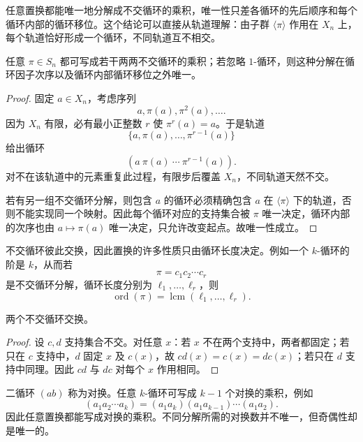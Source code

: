 任意置换都能唯一地分解成不交循环的乘积，唯一性只差各循环的先后顺序和每个循环内部的循环移位。这个结论可以直接从轨道理解：由子群 $\langle\pi\rangle$ 作用在 $X_n$ 上，每个轨道恰好形成一个循环，不同轨道互不相交。

\begin{proposition}[不交循环分解的唯一性]
任意 $\pi\in S_n$ 都可写成若干两两不交循环的乘积；若忽略 $1$-循环，则这种分解在循环因子次序以及循环内部循环移位之外唯一。

\end{proposition}

\begin{proof}
固定 $a\in X_n$，考虑序列
\[
a,\pi(a),\pi^2(a),\dots.
\]
因为 $X_n$ 有限，必有最小正整数 $r$ 使 $\pi^r(a)=a$。于是轨道
\[
\{a,\pi(a),\dots,\pi^{r-1}(a)\}
\]
给出循环
\[
(a\ \pi(a)\ \cdots\ \pi^{r-1}(a)).
\]
对不在该轨道中的元素重复此过程，有限步后覆盖 $X_n$，不同轨道天然不交。

若有另一组不交循环分解，则包含 $a$ 的循环必须精确包含 $a$ 在 $\langle\pi\rangle$ 下的轨道，否则不能实现同一个映射。因此每个循环对应的支持集合被 $\pi$ 唯一决定，循环内部的次序也由 $a\mapsto\pi(a)$ 唯一决定，只允许改变起点。故唯一性成立。
\end{proof}

不交循环彼此交换，因此置换的许多性质只由循环长度决定。例如一个 $k$-循环的阶是 $k$，从而若
\[
\pi=c_1c_2\cdots c_r
\]
是不交循环分解，循环长度分别为 $\ell_1,\dots,\ell_r$，则
\begin{equation}
\operatorname{ord}(\pi)=\operatorname{lcm}(\ell_1,\dots,\ell_r).
\label{eq:permutation-order-lcm}
\end{equation}

\begin{proposition}
两个不交循环交换。
\end{proposition}

\begin{proof}
设 $c,d$ 支持集合不交。对任意 $x$：若 $x$ 不在两个支持中，两者都固定；若只在 $c$ 支持中，$d$ 固定 $x$ 及 $c(x)$，故 $cd(x)=c(x)=dc(x)$；若只在 $d$ 支持中同理。因此 $cd$ 与 $dc$ 对每个 $x$ 作用相同。
\end{proof}


二循环 $(ab)$ 称为对换。任意 $k$-循环可写成 $k-1$ 个对换的乘积，例如
\begin{equation}
(a_1a_2\cdots a_k)
=(a_1a_k)(a_1a_{k-1})\cdots(a_1a_2).
\label{eq:cycle-as-transpositions}
\end{equation}
因此任意置换都能写成对换的乘积。不同分解所需的对换数并不唯一，但奇偶性却是唯一的。

